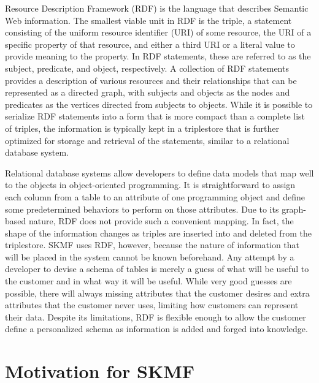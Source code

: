 Resource Description Framework
\cite{rdf}
(RDF) is the language that describes Semantic Web information. The smallest viable unit in RDF is the triple, a statement consisting of the uniform resource identifier (URI) of some resource, the URI of a specific property of that resource, and either a third URI or a literal value to provide meaning to the property. In RDF statements, these are referred to as the subject, predicate, and object, respectively. A collection of RDF statements provides a description of various resources and their relationships that can be represented as a directed graph, with subjects and objects as the nodes and predicates as the vertices directed from subjects to objects. While it is possible to serialize RDF statements into a form that is more compact than a complete list of triples, the information is typically kept in a triplestore that is further optimized for storage and retrieval of the statements, similar to a relational database system.

Relational database systems allow developers to define data models that map well to the objects in object-oriented programming. It is straightforward to assign each column from a table to an attribute of one programming object and define some predetermined behaviors to perform on those attributes. Due to its graph-based nature, RDF does not provide such a convenient mapping. In fact, the shape of the information changes as triples are inserted into and deleted from the triplestore. SKMF uses RDF, however, because the nature of information that will be placed in the system cannot be known beforehand. Any attempt by a developer to devise a schema of tables is merely a guess of what will be useful to the customer and in what way it will be useful. While very good guesses are possible, there will always missing attributes that the customer desires and extra attributes that the customer never uses, limiting how customers can represent their data. Despite its limitations, RDF is flexible enough to allow the customer define a personalized schema as information is added and forged into knowledge.


\section{Motivation for SKMF}
\label{intro:motive}

